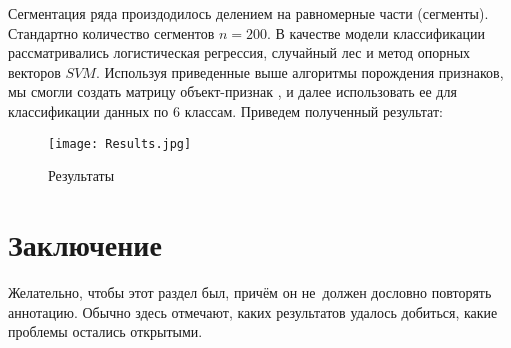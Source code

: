 \documentclass[12pt,twoside]{article}
\begin{document}
Сегментация ряда произдодилось делением на равномерные части (сегменты).  Стандартно  количество сегментов $n = 200$. В качестве  модели классификации  рассматривались логистическая регрессия, случайный лес и  метод опорных векторов $SVM$.
\newpage 
Используя приведенные выше алгоритмы порождения признаков, мы смогли создать матрицу объект-признак , и далее использовать ее для классификации данных по 6 классам.  Приведем полученный результат:
\begin{figure}[h]
\centering
\texttt{[image: Results.jpg]}
\caption{Результаты}
\end{figure}
\section{Заключение}
Желательно, чтобы этот раздел был, причём он не~должен дословно повторять аннотацию.
Обычно здесь отмечают,
каких результатов удалось добиться,
какие проблемы остались открытыми.






\end{document}
